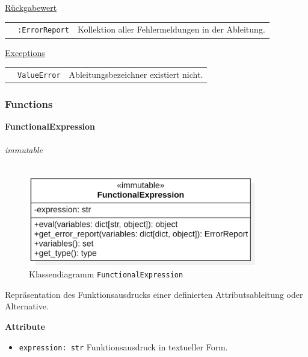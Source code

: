 \documentclass{article}
\begin{document}
\begin{itemize}
\underline{{Rückgabewert}}

\begin{tabular}{lll}
 & \texttt{:ErrorReport} & Kollektion aller Fehlermeldungen in der Ableitung. \\
\end{tabular}

\underline{Exceptions}\\
\begin{tabular}{lll}
 & \texttt{ValueError} & Ableitungsbezeichner existiert nicht.\\
\end{tabular}
\end{itemize}

\newpage
\subsubsection{Functions}
\textbf{\large{FunctionalExpression}}\\\\
\textit{\flqq{}immutable\frqq}\normalsize\\\\
\begin{figure}[H]%
    \centering
    \includegraphics[width=10cm]{entwurf/Entwurf_dokument/img/cls/model/FunctionalExpression.png}
    \caption{Klassendiagramm \texttt{FunctionalExpression}}
\end{figure}

Repräsentation des Funktionsausdrucks einer definierten Attributsableitung oder Alternative.
\newline \newline

\textbf{{Attribute}}
\begin{itemize}
\item \texttt{expression: str} \newline Funktionsausdruck in textueller Form.
\\\\
\end{itemize}
\end{document}
